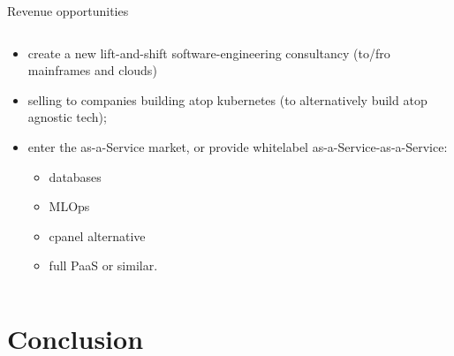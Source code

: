 \documentclass[aspectratio=169]{beamer}
\begin{document}
\begin{frame}{Revenue opportunities}
    \begin{columns}
        \begin{column}{0.617\textwidth}
    
\begin{itemize}[<+->]
    \item create a new lift-and-shift software-engineering consultancy (to/fro mainframes and clouds)
    \item selling to companies building atop kubernetes (to alternatively build atop agnostic tech);
    \item enter the as-a-Service market, or provide whitelabel as-a-Service-as-a-Service:
    \begin{itemize}[<+->]
        \item databases
        \item MLOps
        \item cpanel alternative
        \item full PaaS\textellipsis{} or similar.
    \end{itemize}
\end{itemize}
\end{column}
\end{columns}
\end{frame}

\section{Conclusion}
\end{document}
